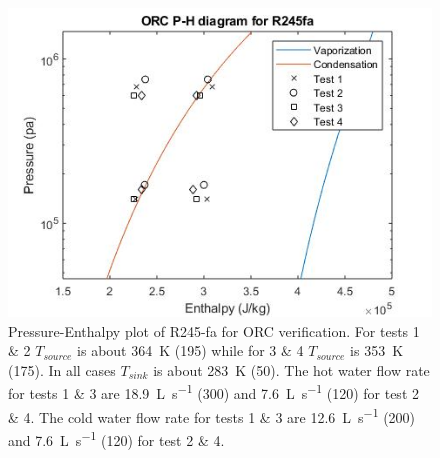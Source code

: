 \begin{figure}[h]
	\centering
	\caption{Pressure-Enthalpy plot of R245-fa for ORC verification. 
		For tests 1 \& 2 $T_{source}$ is about \SI{364}{\kelvin} (\SI{195}{\degreeFahrenheit})
		while for 3 \& 4 $T_{source}$ is \SI{353}{\kelvin} (\SI{175}{\degreeFahrenheit}). 
		In all cases $T_{sink}$ is about \SI{283}{\kelvin} (\SI{50}{\degreeFahrenheit}). 
		The hot water flow rate for tests 1 \& 3 are \SI{18.9}{\liter\per\second} (\SI{300}{\gpm})
		and	\SI{7.6}{\liter\per\second} (\SI{120}{\gpm}) for test 2 \& 4. 
		The cold water flow rate for tests 1 \& 3 are \SI{12.6}{\liter\per\second} (\SI{200}{\gpm})
		and \SI{7.6}{\liter\per\second} (\SI{120}{\gpm}) for test 2 \& 4.}
	\label{fig:verifcation_ph01}
	
	\includegraphics[width=\textwidth]{figures/VerificationPH01}
\end{figure}